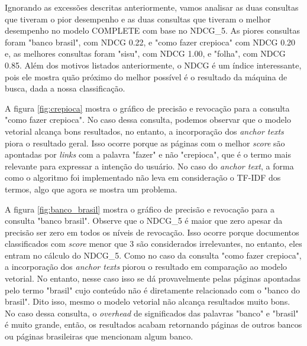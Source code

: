 \documentclass{article}
\begin{document}
Ignorando as excessões descritas anteriormente, vamos analisar as duas consultas que tiveram o pior desempenho e as
duas consultas que tiveram o melhor desempenho no modelo COMPLETE com base no NDCG\_5. As piores consultas foram "banco brasil",
com NDCG 0.22, e "como fazer crepioca" com NDCG 0.20 e, as melhores consultas foram "sisu", com NDCG 1.00, e "folha", com
NDCG 0.85. Além dos motivos listados anteriormente, o NDCG é um índice interessante, pois ele mostra quão próximo do melhor
possível é o resultado da máquina de busca, dada a nossa classificação.

A figura \ref{fig:crepioca} mostra o gráfico de precisão e revocação para a consulta "como fazer crepioca". No caso dessa consulta,
podemos observar que o modelo vetorial alcança bons resultados, no entanto, a incorporação dos \textit{anchor texts} piora o 
resultado geral. Isso ocorre porque as páginas com o melhor \textit{score} são apontadas por \textit{links} com
a palavra "fazer" e não "crepioca", que é o termo mais relevante para expressar a intenção do usuário. No caso do \textit{anchor text},
a forma como o algoritmo foi implementado não leva em consideração o TF-IDF dos termos, algo que agora se mostra um problema.

A figura \ref{fig:banco_brasil} mostra o gráfico de precisão e revocação para a consulta "banco brasil". Observe que o NDCG\_5 é maior
que zero apesar da precisão ser zero em todos os níveis de revocação. Isso ocorre porque documentos classificados com \textit{score} 
menor que 3 são considerados irrelevantes, no entanto, eles entram no cálculo do NDCG\_5.
Como no caso da consulta "como fazer crepioca", a incorporação dos \textit{anchor texts} piorou o resultado em comparação ao modelo vetorial. No entanto,
nesse caso isso se dá provavelmente pelas páginas apontadas pelo termo "brasil" cujo conteúdo não é diretamente relacionado com
o "banco do brasil". Dito isso, mesmo o modelo vetorial não alcança resultados muito bons. No caso dessa consulta, o \textit{overhead}
de significados das palavras "banco" e "brasil" é muito grande, então, os resultados acabam retornando páginas de outros bancos ou páginas
brasileiras que mencionam algum banco.
\end{document}
